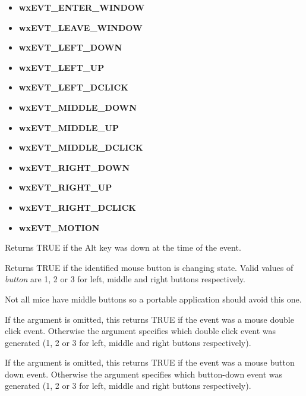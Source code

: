 \begin{itemize}
\itemsep=0pt
\item {\bf wxEVT\_ENTER\_WINDOW}
\item {\bf wxEVT\_LEAVE\_WINDOW}
\item {\bf wxEVT\_LEFT\_DOWN}
\item {\bf wxEVT\_LEFT\_UP}
\item {\bf wxEVT\_LEFT\_DCLICK}
\item {\bf wxEVT\_MIDDLE\_DOWN}
\item {\bf wxEVT\_MIDDLE\_UP}
\item {\bf wxEVT\_MIDDLE\_DCLICK}
\item {\bf wxEVT\_RIGHT\_DOWN}
\item {\bf wxEVT\_RIGHT\_UP}
\item {\bf wxEVT\_RIGHT\_DCLICK}
\item {\bf wxEVT\_MOTION}
\end{itemize}



Returns TRUE if the Alt key was down at the time of the event.



Returns TRUE if the identified mouse button is changing state. Valid
values of {\it button} are 1, 2 or 3 for left, middle and right
buttons respectively.

Not all mice have middle buttons so a portable application should avoid
this one.

\label{buttondclick}


If the argument is omitted, this returns TRUE if the event was a mouse
double click event. Otherwise the argument specifies which double click event
was generated (1, 2 or 3 for left, middle and right buttons respectively).



If the argument is omitted, this returns TRUE if the event was a mouse
button down event. Otherwise the argument specifies which button-down event
was generated (1, 2 or 3 for left, middle and right buttons respectively).


